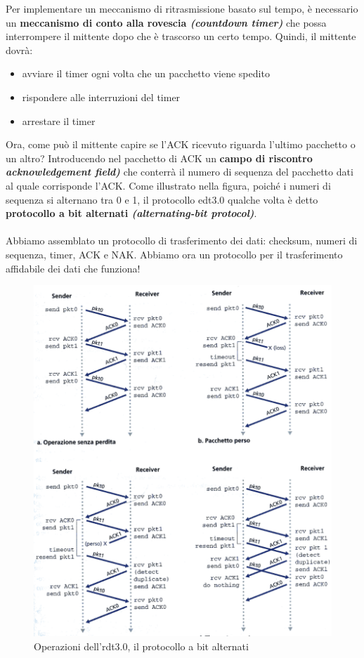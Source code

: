 \documentclass[11pt,a4paper]{article}
\begin{document}
Per implementare un meccanismo di ritrasmissione basato sul tempo, è necessario un \textbf{meccanismo di conto alla rovescia \textit{(countdown timer)}} che possa interrompere il mittente dopo che è trascorso un certo tempo. Quindi, il mittente dovrà:
\begin{itemize}
	\item avviare il timer ogni volta che un pacchetto viene spedito
	\item rispondere alle interruzioni del timer
	\item arrestare il timer
\end{itemize}
Ora, come può il mittente capire se l'ACK ricevuto riguarda l'ultimo pacchetto o un altro? Introducendo nel pacchetto di ACK un \textbf{campo di riscontro \textit{acknowledgement field)}} che conterrà il numero di sequenza del pacchetto dati al quale corrisponde l'ACK.
Come illustrato nella figura, poiché i numeri di sequenza si alternano tra 0 e 1, il protocollo edt3.0 qualche volta è detto \textbf{protocollo a bit alternati \textit{(alternating-bit protocol)}}. \\ \\
Abbiamo assemblato un protocollo di trasferimento dei dati: checksum, numeri di sequenza, timer, ACK e NAK. Abbiamo ora un protocollo per il trasferimento affidabile dei dati che funziona!
\begin{figure}
	\includegraphics[scale=0.6]{img/022.png}
	\caption{Operazioni dell'rdt3.0, il protocollo a bit alternati}
\end{figure}
\end{document}
